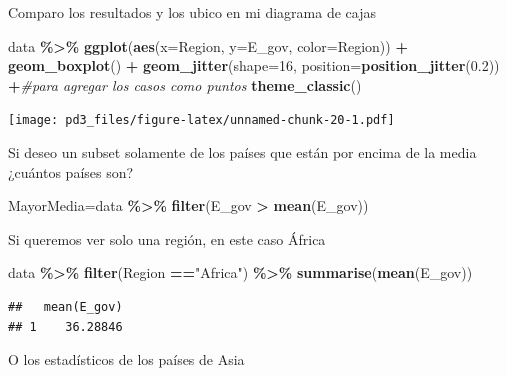 \documentclass[
]{article}
\newenvironment{Shaded}{\begin{snugshade}}{\end{snugshade}}
\newcommand{\AttributeTok}[1]{\textcolor[rgb]{0.13,0.29,0.53}{#1}}
\newcommand{\CommentTok}[1]{\textcolor[rgb]{0.56,0.35,0.01}{\textit{#1}}}
\newcommand{\DecValTok}[1]{\textcolor[rgb]{0.00,0.00,0.81}{#1}}
\newcommand{\FloatTok}[1]{\textcolor[rgb]{0.00,0.00,0.81}{#1}}
\newcommand{\FunctionTok}[1]{\textcolor[rgb]{0.13,0.29,0.53}{\textbf{#1}}}
\newcommand{\NormalTok}[1]{#1}
\newcommand{\OtherTok}[1]{\textcolor[rgb]{0.56,0.35,0.01}{#1}}
\newcommand{\SpecialCharTok}[1]{\textcolor[rgb]{0.81,0.36,0.00}{\textbf{#1}}}
\newcommand{\StringTok}[1]{\textcolor[rgb]{0.31,0.60,0.02}{#1}}
\begin{document}
Comparo los resultados y los ubico en mi diagrama de cajas

\begin{Shaded}
\begin{Highlighting}[]
\NormalTok{ data }\SpecialCharTok{\%\textgreater{}\%}
\FunctionTok{ggplot}\NormalTok{(}\FunctionTok{aes}\NormalTok{(}\AttributeTok{x=}\NormalTok{Region, }\AttributeTok{y=}\NormalTok{E\_gov, }\AttributeTok{color=}\NormalTok{Region)) }\SpecialCharTok{+} 
  \FunctionTok{geom\_boxplot}\NormalTok{() }\SpecialCharTok{+} 
  \FunctionTok{geom\_jitter}\NormalTok{(}\AttributeTok{shape=}\DecValTok{16}\NormalTok{, }\AttributeTok{position=}\FunctionTok{position\_jitter}\NormalTok{(}\FloatTok{0.2}\NormalTok{)) }\SpecialCharTok{+}\CommentTok{\#para agregar los casos como puntos}
  \FunctionTok{theme\_classic}\NormalTok{()}
\end{Highlighting}
\end{Shaded}

\texttt{[image: pd3\_files/figure-latex/unnamed-chunk-20-1.pdf]}

Si deseo un subset solamente de los países que están por encima de la
media ¿cuántos países son?

\begin{Shaded}
\begin{Highlighting}[]
\NormalTok{MayorMedia}\OtherTok{=}\NormalTok{data }\SpecialCharTok{\%\textgreater{}\%}
  \FunctionTok{filter}\NormalTok{(E\_gov }\SpecialCharTok{\textgreater{}} \FunctionTok{mean}\NormalTok{(E\_gov)) }
\end{Highlighting}
\end{Shaded}

Si queremos ver solo una región, en este caso África

\begin{Shaded}
\begin{Highlighting}[]
\NormalTok{data }\SpecialCharTok{\%\textgreater{}\%} 
  \FunctionTok{filter}\NormalTok{(Region }\SpecialCharTok{==}\StringTok{"Africa"}\NormalTok{) }\SpecialCharTok{\%\textgreater{}\%}
  \FunctionTok{summarise}\NormalTok{(}\FunctionTok{mean}\NormalTok{(E\_gov))}
\end{Highlighting}
\end{Shaded}

\begin{verbatim}
##   mean(E_gov)
## 1    36.28846
\end{verbatim}

O los estadísticos de los países de Asia
\end{document}
